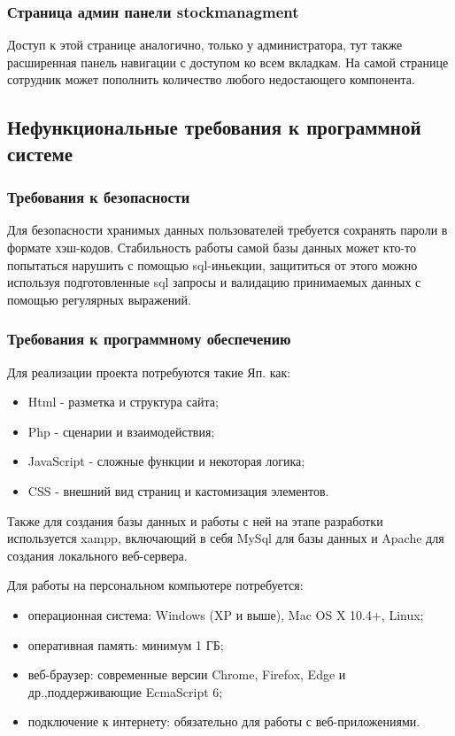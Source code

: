 \subsubsection{Страница админ панели stockmanagment}

Доступ к этой странице аналогично, только у администратора, тут также расширенная панель навигации с доступом ко всем вкладкам. На самой странице сотрудник может пополнить количество любого недостающего компонента.

\subsection{Нефункциональные требования к программной системе}

\subsubsection{Требования к безопасности}
Для безопасности хранимых данных пользователей требуется сохранять пароли в формате  хэш-кодов. Стабильность работы самой базы данных может кто-то попытаться нарушить с помощью sql-иньекции, защититься от этого можно используя подготовленные sql запросы и валидацию принимаемых данных с помощью регулярных выражений.
\subsubsection{Требования к программному обеспечению}
Для реализации проекта потребуются такие Яп. как:
\begin{itemize}
	\item Html - разметка и структура сайта;
	\item Php - сценарии и взаимодействия;
	\item JavaScript - сложные функции и некоторая логика;
	\item CSS - внешний вид страниц и кастомизация элементов.		
\end{itemize}

Также для создания базы данных и работы с ней на этапе разработки используется xampp, включающий в себя MySql для базы данных и Apache для создания локального веб-сервера. 

Для работы на персональном компьютере потребуется:
\begin{itemize}
	\item операционная система: Windows (XP и выше), Mac OS X 10.4+, Linux;
	\item оперативная память: минимум 1 ГБ;
	\item веб-браузер: современные версии Chrome, Firefox, Edge и др.,поддерживающие EcmaScript 6;
	\item подключение к интернету: обязательно для работы с веб-приложениями.		
\end{itemize}


